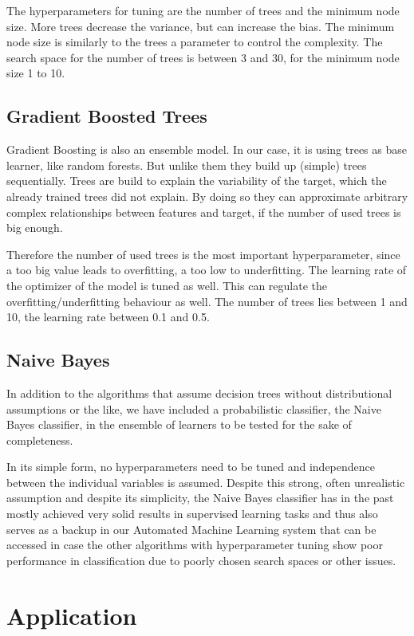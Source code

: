\documentclass{article}
\begin{document}
The hyperparameters for tuning are the number of trees and the minimum node size. More trees decrease the variance, but can increase the bias. The minimum node size is similarly to the trees a parameter to control the complexity. The search space for the number of trees is between 3 and 30, for the minimum node size 1 to 10.
\cite{ranger}

\subsection{Gradient Boosted Trees}
Gradient Boosting is also an ensemble model. In our case, it is using trees as base learner, like random forests. But unlike them they build up (simple) trees sequentially. Trees are build to explain the variability of the target, which the already trained trees did not explain. By doing so they can approximate arbitrary complex relationships between features and target, if the number of used trees is big enough.

Therefore the number of used trees is the most important hyperparameter, since a too big value leads to overfitting, a too low to underfitting. The learning rate of the optimizer of the model is tuned as well. This can regulate the overfitting/underfitting behaviour as well. The number of trees lies between 1 and 10, the learning rate between 0.1 and 0.5.
\cite{xgboost}

\subsection{Naive Bayes}
In addition to the algorithms that assume decision trees without distributional assumptions or the like, we have included a probabilistic classifier, the Naive Bayes classifier, in the ensemble of learners to be tested for the sake of completeness. 

In its simple form, no hyperparameters need to be tuned and independence between the individual variables is assumed. Despite this strong, often unrealistic assumption and despite its simplicity, the Naive Bayes classifier has in the past mostly achieved very solid results in supervised learning tasks and thus also serves as a backup in our Automated Machine Learning system that can be accessed in case the other algorithms with hyperparameter tuning show poor performance in classification due to poorly chosen search spaces or other issues.
\cite{nbayes}

\section{Application}
\end{document}
